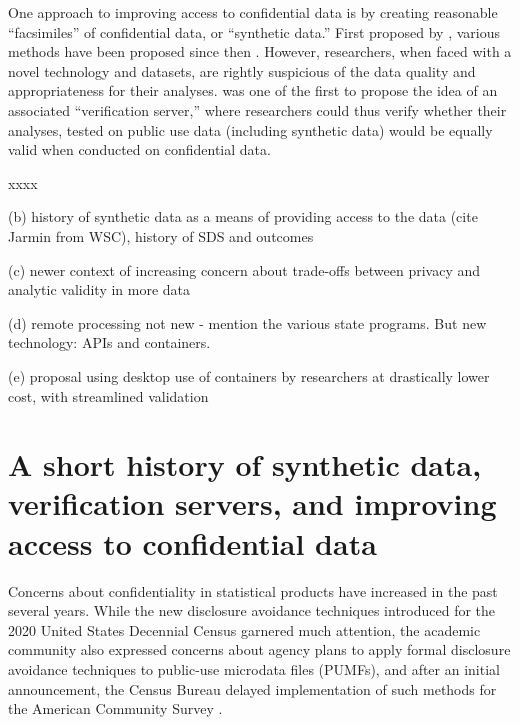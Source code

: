 \documentclass{article}
\begin{document}
One approach to improving access to confidential data is by creating reasonable ``facsimiles'' of confidential data, or ``synthetic data.'' First proposed by \citet{rubin_discussion_1993}, various methods have been proposed since then \citep[see ][ for a recent overview]{raghunathan_synthetic_2021}. However, researchers, when faced with a novel technology and datasets, are rightly suspicious of the data quality and appropriateness for their analyses. \citet{reiter_verification_2009} was one of the first to propose the idea of an associated ``verification server,'' where researchers could thus verify whether their analyses, tested on public use data (including synthetic data) would be equally valid when conducted on confidential data. 

xxxx

(b) history of synthetic data as a means of providing access to the data (cite Jarmin from WSC), history of SDS and outcomes \citep{KinneyEtAl2011,RePEc:cen:wpaper:14-10}

(c) newer context of increasing concern about trade-offs between privacy and analytic validity in more data

(d) remote processing not new - mention the various state programs. But new technology: APIs and containers.

(e) proposal using desktop use of containers by researchers at drastically lower cost, with streamlined validation

\section{A short history of synthetic data, verification servers, and improving access to confidential data}
\label{sec1}
\label{intro}

Concerns about confidentiality in statistical products have increased in the past several years. While the new disclosure avoidance techniques introduced for the 2020 United States Decennial Census \citep{abowd_2020_2022} garnered much attention, the academic community also expressed concerns about agency plans to apply formal disclosure avoidance techniques to public-use microdata files (PUMFs), and after an initial announcement, the Census Bureau delayed implementation of such methods for the American Community Survey \citep{daily_disclosure_2022}.
\end{document}
